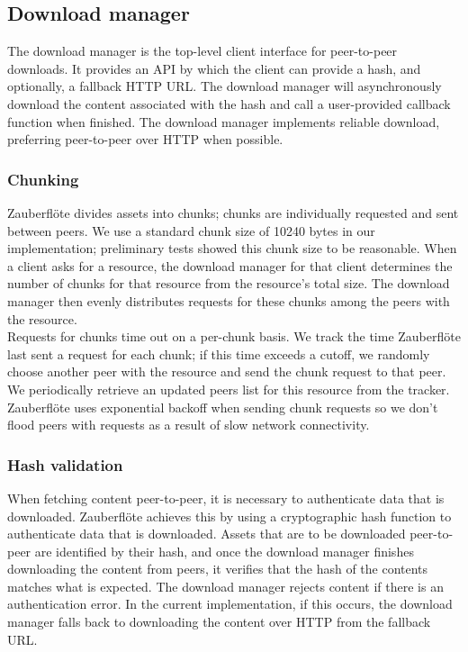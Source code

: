 \documentclass[letterpaper,twocolumn,10pt]{article}
\newcommand{\zbf}{Zauberfl\"{o}te\xspace}
\begin{document}
\subsection{Download manager}

The download manager is the top-level client interface for peer-to-peer
downloads. It provides an API by which the client can provide a hash, and
optionally, a fallback HTTP URL. The download manager will asynchronously
download the content associated with the hash and call a user-provided callback
function when finished. The download manager implements reliable download,
preferring peer-to-peer over HTTP when possible.

\subsubsection{Chunking}

\zbf divides assets into chunks; chunks are individually requested and
sent between peers. We use a standard chunk size of 10240 bytes in our
implementation; preliminary tests showed this chunk size to be reasonable.
When a client asks for a resource, the download manager for that client
determines the number of chunks for that resource from the resource's total size.
The download manager then evenly distributes requests for these chunks
among the peers with the resource. \\
Requests for chunks time out on a per-chunk basis. We track the time \zbf
last sent a request for each chunk; if this time exceeds a cutoff, we randomly
choose another peer with the resource and send the chunk request to that
peer. We periodically retrieve an updated peers list for this resource
from the tracker. \zbf uses exponential backoff when sending chunk requests
so we don't flood peers with requests as a result of slow network connectivity.

\subsubsection{Hash validation}

When fetching content peer-to-peer, it is necessary to authenticate data that
is downloaded. \zbf achieves this by using a cryptographic hash function to
authenticate data that is downloaded. Assets that are to be downloaded
peer-to-peer are identified by their hash, and once the download manager
finishes downloading the content from peers, it verifies that the hash of the
contents matches what is expected. The download manager rejects content if
there is an authentication error. In the current implementation, if this
occurs, the download manager falls back to downloading the content over HTTP
from the fallback URL.
\end{document}
